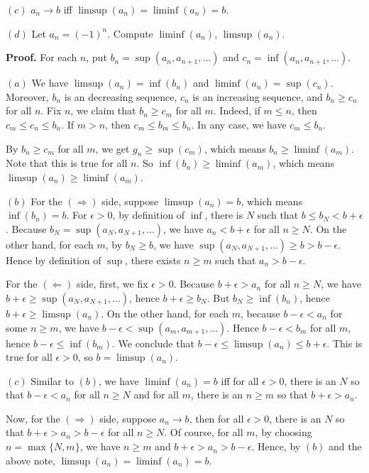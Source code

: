 \documentclass{article}
\begin{document}
$(c)$ $a_n \to b$ iff $\limsup(a_n) = \liminf(a_n) = b$.

$(d)$ Let $a_n = (-1)^n$. Compute $\liminf(a_n)$, $\limsup(a_n)$.

\textbf{Proof.} For each $n$, put $b_n = \sup(a_n,a_{n+1},\ldots)$ and
$c_n = \inf(a_n,a_{n+1},\ldots)$.

$(a)$ We have $\limsup(a_n) = \inf(b_n)$ and $\liminf(a_n)= \sup(c_n)$.
Moreover, $b_n$ is an decreasing sequence, $c_n$ is an increasing
sequence, and $b_n \ge c_n$ for all $n$. Fix $n$, we claim that
$b_n \ge c_m$ for all $m$. Indeed, if $m \le n$, then
$c_m \le c_n \le b_n$. If $m > n$, then $c_m \le b_m \le b_n$. In any
case, we have $c_m \le b_n$.

By $b_n \ge c_m$ for all $m$, we get $g_n \ge \sup(c_m)$, which means
$b_n \ge \liminf(a_m)$. Note that this is true for all $n$. So
$\inf(b_n) \ge \liminf(a_m)$, which means
$\limsup(a_n) \ge \liminf(a_m)$.

$(b)$ For the $(\Rightarrow)$ side, suppose $\limsup(a_n) = b$, which
means $\inf(b_n) = b$. For $\epsilon > 0$, by definition of $\inf$,
there is $N$ such that $b \le b_N < b + \epsilon$. Because
$b_N=\sup(a_N,a_{N+1},\ldots)$, we have $a_n < b + \epsilon$ for all
$n\ge N$. On the other hand, for each $m$, by $b_N \ge b$, we have
$\sup(a_N, a_{N+1},\ldots) \ge b > b-\epsilon$. Hence by definition of
$\sup$, there exists $n\ge m$ such that $a_n > b-\epsilon$.

For the $(\Leftarrow)$ side, first, we fix $\epsilon > 0$. Because
$b + \epsilon > a_n$ for all $n \ge N$, we have
$b + \epsilon \ge \sup(a_N,a_{N+1},\ldots)$, hence $b+\epsilon \ge b_N$.
But $b_N \ge \inf(b_n)$, hence $b+\epsilon \ge \limsup(a_n)$. On the
other hand, for each $m$, because $b - \epsilon < a_n$ for some
$n \ge m$, we have $b-\epsilon < \sup(a_m,a_{m+1},\ldots)$. Hence
$b - \epsilon < b_m$ for all $m$, hence $b-\epsilon \le \inf(b_m)$. We
conclude that $b-\epsilon \le \limsup(a_n) \le b+ \epsilon$. This is
true for all $\epsilon>0$, so $b = \limsup(a_n)$.

$(c)$ Similar to $(b)$, we have $\liminf(a_n) = b$ iff for all
$\epsilon > 0$, there is an $N$ so that $b-\epsilon < a_n$ for all
$n\ge N$ and for all $m$, there is an $n \ge m$ so that
$b+\epsilon > a_n$.

Now, for the $(\Rightarrow)$ side, suppose $a_n \to b$, then for all
$\epsilon > 0$, there is an $N$ so that
$b + \epsilon > a_n > b-\epsilon$ for all $n\ge N$. Of course, for all
$m$, by choosing $n = \max\{N,m\}$, we have $n \ge m$ and
$b + \epsilon > a_n > b-\epsilon$. Hence, by $(b)$ and the above note,
$\limsup(a_n) = \liminf(a_n) = b$.
\end{document}
